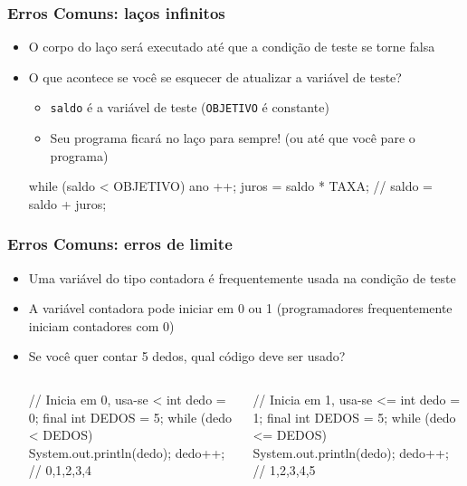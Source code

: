 \documentclass[xcolor={dvipsnames,table},aspectratio=169]{beamer}
\begin{document}
\begin{frame}[fragile]\frametitle{Erros Comuns: laços infinitos}
\begin{itemize}
	\item O corpo do laço será executado até que a condição de teste se torne falsa
	\item O que acontece se você se esquecer de atualizar a variável de teste?
	\begin{itemize}
		\item \texttt{saldo} é a variável de teste (\texttt{OBJETIVO} é constante)
		\item Seu programa ficará no laço para sempre! (ou até que você pare o programa)
	\end{itemize}
\begin{javacode}
while (saldo < OBJETIVO) {
   ano	++;
   juros = saldo * TAXA;
   // saldo = saldo + juros;
}
\end{javacode}
\end{itemize}
\end{frame}

\begin{frame}[fragile]\frametitle{Erros Comuns: erros de limite}
\begin{itemize}
	\item Uma variável do tipo contadora é frequentemente usada na condição de teste
	\item A variável contadora pode iniciar em 0 ou 1 (programadores frequentemente iniciam contadores com 0)
	\item Se você quer contar 5 dedos, qual código deve ser usado?
\begin{columns}[T]
	\begin{column}{0.5\linewidth}
\begin{javacode}
// Inicia em 0, usa-se <
int dedo = 0;
final int DEDOS = 5;
while (dedo < DEDOS) {
   System.out.println(dedo);
   dedo++;
}
// 0,1,2,3,4
\end{javacode}
	\end{column}
	\begin{column}{0.5\linewidth}
\begin{javacode}
// Inicia em 1, usa-se <=
int dedo = 1;
final int DEDOS = 5;
while (dedo <= DEDOS) {
   System.out.println(dedo);
   dedo++;
}
// 1,2,3,4,5
\end{javacode}
	\end{column}
\end{columns}
\end{itemize}
\end{frame}
\end{document}
